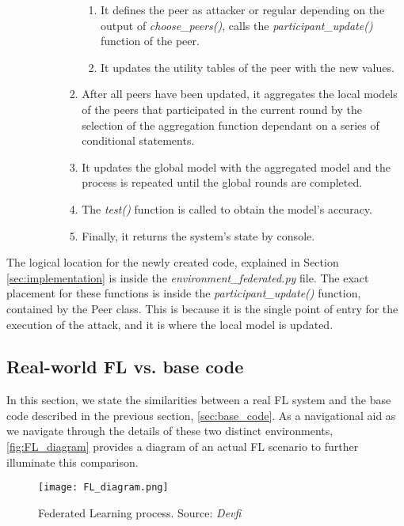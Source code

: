 \begin{itemize}
\begin{itemize}
\begin{itemize}
\begin{enumerate}
                                \begin{enumerate}
                                        \item It defines the peer as attacker or regular depending on the output of \textit{choose\_peers()}, calls the \textit{participant\_update()} function of the peer.
                                        \item It updates the utility tables of the peer with the new values.
                                \end{enumerate}
                                \item After all peers have been updated, it aggregates the local models of the peers that participated in the current round by the selection of the aggregation function dependant on a series of conditional statements.
                                \item It updates the global model with the aggregated model and the process is repeated until the global rounds are completed.
                                \item The \textit{test()} function is called to obtain the model's accuracy.
                                \item Finally, it returns the system's state by console.
                        \end{enumerate}
                \end{itemize}
        \end{itemize}
\end{itemize}
The logical location for the newly created code, explained in Section \ref{sec:implementation} is inside the \textit{environment\_federated.py} file. The exact placement for these functions is inside the \textit{participant\_update()} function, contained by the Peer class.
This is because it is the single point of entry for the execution of the attack, and it is where the local model is updated.

\subsection{Real-world FL vs. base code}
In this section, we state the similarities between a real FL system and the base code described in the previous section, \ref{sec:base_code}. As a navigational aid as we navigate through the details of these two distinct environments, \autoref{fig:FL_diagram} provides a diagram of an actual FL scenario to further illuminate this comparison. 
\begin{figure}[h!]
        \centering %
        \texttt{[image: FL\_diagram.png]}
        \caption{Federated Learning process. Source: \textit{Devfi}} %
        \label{fig:FL_diagram}
\end{figure}

